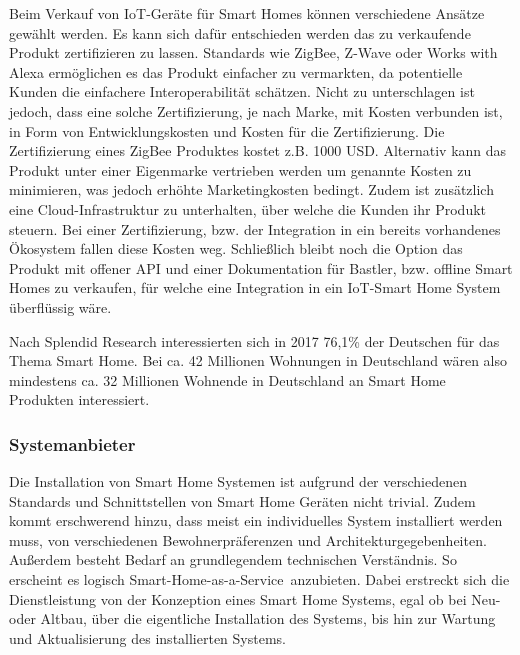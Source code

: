 Beim Verkauf von \ac{IoT}-Geräte für Smart Homes können verschiedene Ansätze gewählt werden.
Es kann sich dafür entschieden werden das zu verkaufende Produkt zertifizieren zu lassen.
Standards wie ZigBee, Z-Wave oder Works with Alexa ermöglichen es das Produkt einfacher zu vermarkten, da potentielle Kunden die einfachere Interoperabilität schätzen.
Nicht zu unterschlagen ist jedoch, dass eine solche Zertifizierung, je nach Marke, mit Kosten verbunden ist, in Form von Entwicklungskosten und Kosten für die Zertifizierung.
Die Zertifizierung eines ZigBee Produktes kostet z.B. 1000 USD.
Alternativ kann das Produkt unter einer Eigenmarke vertrieben werden um genannte Kosten zu minimieren, was jedoch erhöhte Marketingkosten bedingt.
Zudem ist zusätzlich eine Cloud-Infrastruktur zu unterhalten, über welche die Kunden ihr Produkt steuern.
Bei einer Zertifizierung, bzw. der Integration in ein bereits vorhandenes Ökosystem fallen diese Kosten weg.
Schließlich bleibt noch die Option das Produkt mit offener \ac{API} und einer Dokumentation für Bastler, bzw. offline Smart Homes zu verkaufen, für welche eine Integration in ein \ac{IoT}-Smart Home System überflüssig wäre.

Nach Splendid Research interessierten sich in 2017 76,1\% der Deutschen für das Thema Smart Home.
Bei ca. 42 Millionen Wohnungen in Deutschland  wären also mindestens ca. 32 Millionen Wohnende in Deutschland an Smart Home Produkten interessiert.

\subsubsection{Systemanbieter}

Die Installation von Smart Home Systemen ist aufgrund der verschiedenen Standards und Schnittstellen von Smart Home Geräten nicht trivial.
Zudem kommt erschwerend hinzu, dass meist ein individuelles System installiert werden muss,  von verschiedenen Bewohnerpräferenzen und Architekturgegebenheiten.
Außerdem besteht Bedarf an grundlegendem technischen Verständnis.
So erscheint es logisch \glqq Smart-Home-as-a-Service\grqq \ anzubieten.
Dabei erstreckt sich die Dienstleistung von der Konzeption eines Smart Home Systems, egal ob bei Neu- oder Altbau, über die eigentliche Installation des Systems, bis hin zur Wartung und Aktualisierung des installierten Systems.

